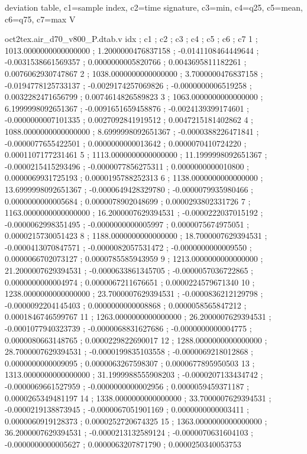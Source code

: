 \expandafter\def\csname oct2tex.air_d70_v800_P.dtab.d\endcsname{deviation table, c1=sample index, c2=time signature, c3=min, c4=q25, c5=mean, c6=q75, c7=max}
\expandafter\def\csname oct2tex.air_d70_v800_P.dtab.u\endcsname{\ensuremath{\text{V}}}
\begin{filecontents}[overwrite]{oct2tex.air_d70_v800_P.dtab.v}
idx ; c1 ; c2 ; c3 ; c4 ; c5 ; c6 ; c7
1 ; 1013.0000000000000000 ; 1.2000000476837158 ; -0.0141108464449644 ; -0.0031538661569357 ; 0.0000000005820766 ; 0.0043695811182261 ; 0.0076062930747867
2 ; 1038.0000000000000000 ; 3.7000000476837158 ; -0.0194778125733137 ; -0.0029174257069826 ; -0.0000000006519258 ; 0.0032282471656799 ; 0.0074614826589823
3 ; 1063.0000000000000000 ; 6.1999998092651367 ; -0.0091651659458876 ; -0.0024139399174601 ; -0.0000000007101335 ; 0.0027092841919512 ; 0.0047215181402862
4 ; 1088.0000000000000000 ; 8.6999998092651367 ; -0.0000388226471841 ; -0.0000077655422501 ; 0.0000000000013642 ; 0.0000070410724220 ; 0.0001107177231461
5 ; 1113.0000000000000000 ; 11.1999998092651367 ; -0.0000215415293496 ; -0.0000077856275311 ; 0.0000000000010800 ; 0.0000069931725193 ; 0.0000195788252313
6 ; 1138.0000000000000000 ; 13.6999998092651367 ; -0.0000649428329780 ; -0.0000079935980466 ; 0.0000000000005684 ; 0.0000078902048699 ; 0.0000293802331726
7 ; 1163.0000000000000000 ; 16.2000007629394531 ; -0.0000222037015192 ; -0.0000062998351495 ; -0.0000000000005997 ; 0.0000075674975051 ; 0.0000215730051423
8 ; 1188.0000000000000000 ; 18.7000007629394531 ; -0.0000413070847571 ; -0.0000082057531472 ; -0.0000000000009550 ; 0.0000066702073127 ; 0.0000785585943959
9 ; 1213.0000000000000000 ; 21.2000007629394531 ; -0.0000633861345705 ; -0.0000057036722865 ; 0.0000000000004974 ; 0.0000067211676651 ; 0.0000224579671340
10 ; 1238.0000000000000000 ; 23.7000007629394531 ; -0.0000836212129798 ; -0.0000092204145403 ; 0.0000000000008868 ; 0.0000058565847212 ; 0.0001846746599767
11 ; 1263.0000000000000000 ; 26.2000007629394531 ; -0.0001077940323739 ; -0.0000068831627686 ; -0.0000000000004775 ; 0.0000080663148765 ; 0.0000229822690017
12 ; 1288.0000000000000000 ; 28.7000007629394531 ; -0.0000199835103558 ; -0.0000069218012868 ; 0.0000000000009095 ; 0.0000063267598307 ; 0.0000677895950503
13 ; 1313.0000000000000000 ; 31.1999988555908203 ; -0.0000207133434742 ; -0.0000069661527959 ; -0.0000000000002956 ; 0.0000059459371187 ; 0.0000265349481197
14 ; 1338.0000000000000000 ; 33.7000007629394531 ; -0.0000219138873945 ; -0.0000067051901169 ; 0.0000000000003411 ; 0.0000060919128373 ; 0.0000252720674325
15 ; 1363.0000000000000000 ; 36.2000007629394531 ; -0.0000213132589124 ; -0.0000070631604103 ; -0.0000000000005627 ; 0.0000063207871790 ; 0.0000250340053753

\end{filecontents}
